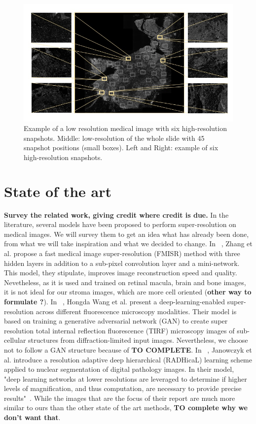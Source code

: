 \documentclass[10pt,conference,compsocconf]{IEEEtran}
\begin{document}
 \begin{figure}[tbp]
  \centering
  \includegraphics[width=\columnwidth]{doc/report/images/scan1.jpg}
  \caption{Example of a low resolution medical image with six high-resolution
snapshots. Middle: low-resolution of the whole slide with 45 snapshot positions
(small boxes). Left and Right: example of six high-resolution snapshots.}
  \vspace{-3mm}
  \label{fig:melanoma-scan}
\end{figure}


\section{State of the art}\label{sec:state-of-art}
\textbf{Survey the related work, giving credit where credit is
  due.} In the literature, several models have been proposed to perform super-resolution on medical images. We will survey them to get an idea what has already been done, from what we will take inspiration and what we decided to change. In ~\cite{zhang2019}, Zhang et al. propose a fast medical image super-resolution (FMISR) method with three hidden layers in addition to a sub-pixel convolution layer and a mini-network. This  model, they stipulate, improves image reconstruction speed and quality. Nevetheless, as it is used and trained on retinal macula, brain and bone images, it is not ideal for our stroma images, which are more cell oriented (\textbf{other way to formulate ?}). In ~\cite{nature2019}, Hongda Wang et al. present a deep-learning-enabled super-resolution across different fluorescence microscopy modalities. Their model is based on training a generative adversarial network (GAN) to create super resolution total internal reflection fluorescence (TIRF) microscopy images of sub-cellular structures from diffraction-limited input images. Nevertheless, we choose not to follow a GAN structure because of \textbf{TO COMPLETE}. In ~\cite{Janowczyk2018}, Janowczyk et al. introduce a resolution adaptive deep hierarchical (RADHicaL) learning scheme applied to nuclear segmentation of digital pathology images. In their model, "deep learning networks at lower resolutions are leveraged to determine if higher levels of magnification, and thus computation, are necessary to provide precise results"~\cite{Janowczyk2018}. While the images that are the focus of their report are much more similar to ours than the other state of the art methods, \textbf{TO complete why we don't want that}. 
  
\end{document}
